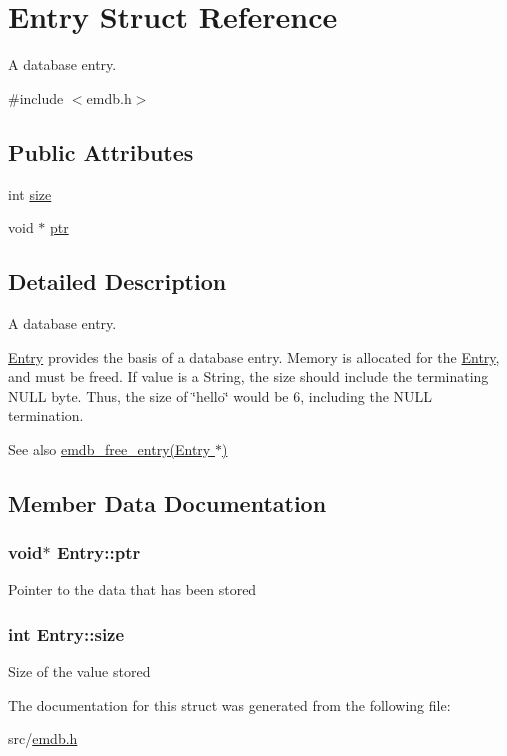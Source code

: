 \hypertarget{struct_entry}{}\section{Entry Struct Reference}
\label{struct_entry}


A database entry.  




{\ttfamily \#include $<$emdb.\+h$>$}

\subsection*{Public Attributes}
\begin{DoxyCompactItemize}
\item 
int \hyperlink{struct_entry_a5a49d6c117452903aa66273955f41ab9}{size}
\item 
void $\ast$ \hyperlink{struct_entry_aa88c7d1c3b4c4e69ea46dc9559224dc1}{ptr}
\end{DoxyCompactItemize}


\subsection{Detailed Description}
A database entry. 

\hyperlink{struct_entry}{Entry} provides the basis of a database entry. Memory is allocated for the \hyperlink{struct_entry}{Entry}, and must be freed. If value is a {\ttfamily String}, the size should include the terminating N\+U\+L\+L byte. Thus, the size of \char`\"{}hello\char`\"{} would be 6, including the N\+U\+L\+L termination. \begin{DoxySeeAlso}{See also}
\hyperlink{emdb_8h_a8fd691da056962b197364ac167e0d421}{emdb\+\_\+free\+\_\+entry(\+Entry $\ast$)} 
\end{DoxySeeAlso}


\subsection{Member Data Documentation}
\hypertarget{struct_entry_aa88c7d1c3b4c4e69ea46dc9559224dc1}{}
\subsubsection[{ptr}]{\setlength{\rightskip}{0pt plus 5cm}void$\ast$ Entry\+::ptr}\label{struct_entry_aa88c7d1c3b4c4e69ea46dc9559224dc1}
Pointer to the data that has been stored \hypertarget{struct_entry_a5a49d6c117452903aa66273955f41ab9}{}
\subsubsection[{size}]{\setlength{\rightskip}{0pt plus 5cm}int Entry\+::size}\label{struct_entry_a5a49d6c117452903aa66273955f41ab9}
Size of the value stored 

The documentation for this struct was generated from the following file\+:\begin{DoxyCompactItemize}
\item 
src/\hyperlink{emdb_8h}{emdb.\+h}\end{DoxyCompactItemize}
